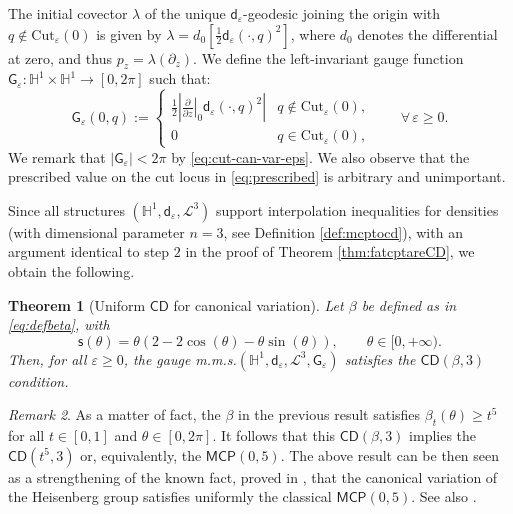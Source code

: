 \documentclass[11pt,a4paper]{article}
\theoremstyle{plain}
\newtheorem{theorem}{Theorem}[section]
\theoremstyle{definition}
\theoremstyle{remark}
\newtheorem{remark}[theorem]{Remark}
\numberwithin{equation}{section}
\renewcommand{\H}{\mathbb{H}}
\newcommand{\Cut}{\mathrm{Cut}}
\newcommand{\CD}{\mathsf{CD}}
\newcommand{\MCP}{\mathsf{MCP}}
\newcommand{\sfs}{\mathsf{s}}
\newcommand{\sfd}{\mathsf d}
\newcommand{\sfG}{\mathsf G}
\begin{document}
The initial covector $\lambda$ of the unique $\sfd_\varepsilon$-geodesic joining the origin with $q\notin \Cut_\varepsilon(0)$ is given by $\lambda = d_0\left[ \tfrac{1}{2}\sfd_\varepsilon(\cdot,q)^2\right]$, where $d_0$ denotes the differential at zero, and thus $p_z = \lambda(\partial_z)$. We define the left-invariant gauge function $\sfG_\varepsilon: \H^1 \times \H^1 \to [0,2\pi]$ such that:
\begin{equation}\label{eq:prescribed}
\sfG_\varepsilon(0,q):=\begin{cases} \tfrac{1}{2}\left|\left.\tfrac{\partial}{\partial z}\right|_{0}\sfd_\varepsilon(\cdot,q)^2\right|  & q\notin \Cut_\varepsilon(0),\\
0 & q\in \Cut_{\varepsilon}(0),
\end{cases}\qquad \forall \, \varepsilon\geq 0.
\end{equation}
We remark that $|\sfG_\varepsilon|<2\pi$ by \eqref{eq:cut-can-var-eps}. We also observe that the prescribed value on the cut locus in \eqref{eq:prescribed} is arbitrary and unimportant.

Since all structures $(\H^1,\sfd_\varepsilon,\mathscr{L}^3)$ support interpolation inequalities for densities (with dimensional parameter $n=3$, see Definition \ref{def:mcptocd}), with an argument identical to step $2$ in the proof of Theorem \ref{thm:fatcptareCD}, we obtain the following.

\begin{theorem}[Uniform $\CD$ for canonical variation]\label{thm:uniformCDHeis}
Let $\beta$ be defined as in \eqref{eq:defbeta}, with
\begin{equation}
\sfs(\theta) =\theta(2-2\cos(\theta)-\theta \sin(\theta)), \qquad \theta \in [0,+\infty).
\end{equation}
Then, for all $\varepsilon\geq 0$, the gauge m.m.s.\@ $(\H^1,\sfd_\varepsilon,\mathscr{L}^3,\sfG_\varepsilon)$ satisfies the $\CD(\beta,3)$ condition.
\end{theorem}
\begin{remark}
As a matter of fact, the $\beta$ in the previous result satisfies $\beta_t(\theta)\geq t^5$ for all $t\in [0,1]$ and $\theta \in [0,2\pi]$. It follows that this $\CD(\beta,3)$ implies the $\CD(t^5,3)$ or, equivalently, the $\MCP(0,5)$. The above result can be then seen as a strengthening of the known fact, proved in \cite{RiffordCarnot}, that the canonical variation of the Heisenberg group satisfies uniformly the classical $\MCP(0,5)$. See also \cite{PL-senzamani}.
\end{remark}
\end{document}

